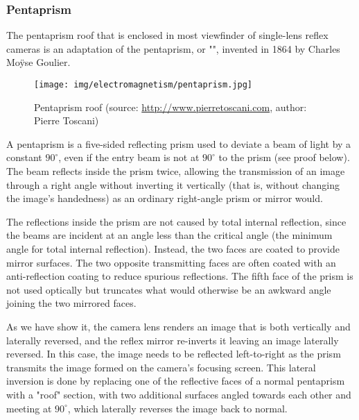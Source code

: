 	\subsubsection{Pentaprism}
	The pentaprism roof that is enclosed  in most viewfinder of single-lens reflex cameras is an adaptation of the pentaprism, or "", invented in 1864 by Charles Moÿse Goulier.
	\begin{figure}[H]
		\centering
		\texttt{[image: img/electromagnetism/pentaprism.jpg]}
		\caption[Pentaprism roof]{Pentaprism roof (source: \url{http://www.pierretoscani.com}, author: Pierre Toscani)}
	\end{figure}
	A pentaprism is a five-sided reflecting prism used to deviate a beam of light by a constant $90^\circ$, even if the entry beam is not at $90^\circ$ to the prism (see proof below). The beam reflects inside the prism twice, allowing the transmission of an image through a right angle without inverting it vertically (that is, without changing the image's handedness) as an ordinary right-angle prism or mirror would.
	
	
	The reflections inside the prism are not caused by total internal reflection, since the beams are incident at an angle less than the critical angle (the minimum angle for total internal reflection). Instead, the two faces are coated to provide mirror surfaces. The two opposite transmitting faces are often coated with an anti-reflection coating to reduce spurious reflections. The fifth face of the prism is not used optically but truncates what would otherwise be an awkward angle joining the two mirrored faces.
	
	As we have show it, the camera lens renders an image that is both vertically and laterally reversed, and the reflex mirror re-inverts it leaving an image laterally reversed. In this case, the image needs to be reflected left-to-right as the prism transmits the image formed on the camera's focusing screen. This lateral inversion is done by replacing one of the reflective faces of a normal pentaprism with a "roof" section, with two additional surfaces angled towards each other and meeting at $90^\circ$, which laterally reverses the image back to normal. 
	
